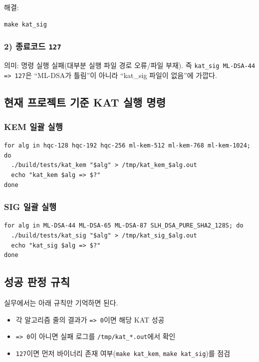 해결:
\begin{lstlisting}[style=cstyle]
make kat_sig
\end{lstlisting}

\subsubsection*{2) 종료코드 \texttt{127}}
의미: 명령 실행 실패(대부분 실행 파일 경로 오류/파일 부재).  
즉 \texttt{kat\_sig ML-DSA-44 => 127}은 ``ML-DSA가 틀림''이 아니라 ``kat\_sig 파일이 없음''에 가깝다.

\subsection{현재 프로젝트 기준 KAT 실행 명령}
\subsubsection*{KEM 일괄 실행}
\begin{lstlisting}[style=cstyle]
for alg in hqc-128 hqc-192 hqc-256 ml-kem-512 ml-kem-768 ml-kem-1024; do
  ./build/tests/kat_kem "$alg" > /tmp/kat_kem_$alg.out
  echo "kat_kem $alg => $?"
done
\end{lstlisting}

\subsubsection*{SIG 일괄 실행}
\begin{lstlisting}[style=cstyle]
for alg in ML-DSA-44 ML-DSA-65 ML-DSA-87 SLH_DSA_PURE_SHA2_128S; do
  ./build/tests/kat_sig "$alg" > /tmp/kat_sig_$alg.out
  echo "kat_sig $alg => $?"
done
\end{lstlisting}

\subsection{성공 판정 규칙}
실무에서는 아래 규칙만 기억하면 된다.
\begin{itemize}[leftmargin=*]
\item 각 알고리즘 줄의 결과가 \texttt{=> 0}이면 해당 KAT 성공
\item \texttt{=> 0}이 아니면 실패 로그를 \texttt{/tmp/kat\_*.out}에서 확인
\item \texttt{127}이면 먼저 바이너리 존재 여부(\texttt{make kat\_kem}, \texttt{make kat\_sig})를 점검
\end{itemize}

